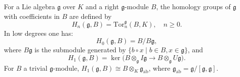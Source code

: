 For a Lie algebra $\mathfrak{g}$ over $K$ and a right $\mathfrak{g}$-module $B$, the homology groups of $\mathfrak{g}$ with coefficients in $B$ are defined by
$$H_n(\mathfrak{g}, B) = \text{Tor}_n^{\mathfrak{g}}(B, K), \quad n \geq 0.$$
In low degrees one has:
$$H_0(\mathfrak{g}, B) = B / B\mathfrak{g},$$
where $B\mathfrak{g}$ is the submodule generated by $\{b \circ x \mid b \in B, x \in \mathfrak{g}\}$, and
$$H_1(\mathfrak{g}, B) = \ker\bigl(B \otimes_{\mathfrak{g}} I\mathfrak{g} \rightarrow B \otimes_{\mathfrak{g}} U\mathfrak{g}\bigr).$$
For $B$ a trivial $\mathfrak{g}$-module, $H_1(\mathfrak{g}, B) \cong B \otimes_K \mathfrak{g}_{\text{ab}}$, where $\mathfrak{g}_{\text{ab}} = \mathfrak{g}/[\mathfrak{g},\mathfrak{g}]$.
